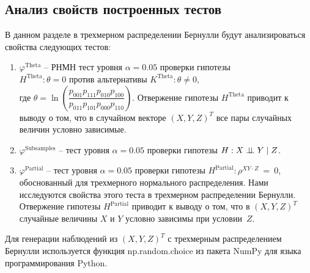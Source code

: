 \newpage
\subsection{Анализ свойств построенных тестов}\label{numerical_exp}

В данном разделе в трехмерном
распределении Бернулли
будут анализироваться свойства
следующих тестов:
\begin{enumerate}
    \item $\varphi^{\text{Theta}}$ -- РНМН тест уровня 
    $\alpha=0.05$ проверки гипотезы \\
    $H^{\text{Theta}}: \theta=0$
    против альтернативы $K^{\text{Theta}}: \theta\neq 0$, \\ где
     $\theta = \ln  \left(\dfrac{p_{001}p_{111}p_{010}p_{100}}{p_{011}p_{101}p_{000}p_{110}}\right)$.
     Отвержение гипотезы $H^{\text{Theta}}$ приводит к выводу
     о том, 
     что в случайном векторе $(X,Y,Z)^T$ все пары случайных величин условно зависимые.
    \item $\varphi^{\text{Subsamples}}$ -- тест уровня $\alpha=0.05$
    проверки гипотезы $H: X \perp\!\!\!\perp Y \mid Z$.
    \item $\varphi^{\text{Partial}}$ -- тест уровня $\alpha=0.05$
    проверки гипотезы $H^{\text{Partial}}: \rho^{XY\cdot Z}~=~0$,
    обоснованный для трехмерного нормального распределения.
    Нами исследуются свойства этого теста в трехмерном
    распределении Бернулли. Отвержение гипотезы 
    $H^{\text{Partial}}$ приводит к выводу о том, что 
    в  $(X,Y,Z)^T$ случайные величины
    $X$ и $Y$ условно зависимы при условии~$Z$.

\end{enumerate}

Для генерации наблюдений из $(X,Y,Z)^T$ 
с трехмерным распределением Бернулли
используется 
функция np.random.choice из пакета NumPy
для языка программирования Python. 

